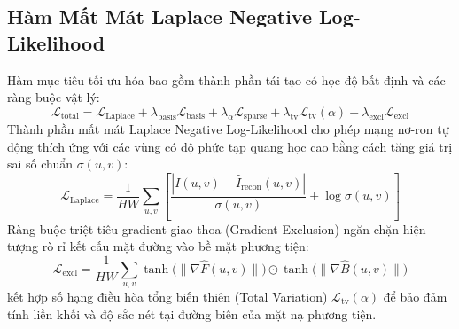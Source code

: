 \documentclass[11pt,a4paper]{article}
\begin{document}
\subsection{Hàm Mất Mát Laplace Negative Log-Likelihood}
Hàm mục tiêu tối ưu hóa bao gồm thành phần tái tạo có học độ bất định và các ràng buộc vật lý:
\begin{equation}
    \mathcal{L}_{\text{total}} = \mathcal{L}_{\text{Laplace}} + \lambda_{\text{basis}} \mathcal{L}_{\text{basis}} + \lambda_{\alpha} \mathcal{L}_{\text{sparse}} + \lambda_{\text{tv}} \mathcal{L}_{\text{tv}}(\alpha) + \lambda_{\text{excl}} \mathcal{L}_{\text{excl}}
\end{equation}
Thành phần mất mát Laplace Negative Log-Likelihood cho phép mạng nơ-ron tự động thích ứng với các vùng có độ phức tạp quang học cao bằng cách tăng giá trị sai số chuẩn $\sigma(u, v)$:
\begin{equation}
    \mathcal{L}_{\text{Laplace}} = \frac{1}{HW} \sum_{u, v} \left[ \frac{|I(u, v) - \hat{I}_{\text{recon}}(u, v)|}{\sigma(u, v)} + \log \sigma(u, v) \right]
\end{equation}
Ràng buộc triệt tiêu gradient giao thoa (Gradient Exclusion) ngăn chặn hiện tượng rò rỉ kết cấu mặt đường vào bề mặt phương tiện:
\begin{equation}
    \mathcal{L}_{\text{excl}} = \frac{1}{HW} \sum_{u, v} \tanh\big(\|\nabla \hat{F}(u, v)\|\big) \odot \tanh\big(\|\nabla \hat{B}(u, v)\|\big)
\end{equation}
kết hợp số hạng điều hòa tổng biến thiên (Total Variation) $\mathcal{L}_{\text{tv}}(\alpha)$ để bảo đảm tính liền khối và độ sắc nét tại đường biên của mặt nạ phương tiện.
\end{document}
